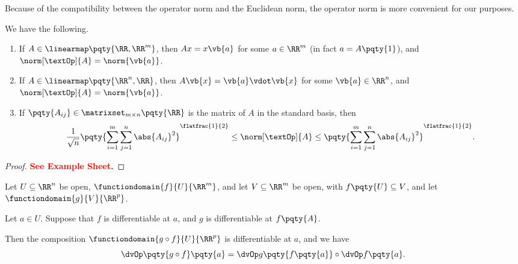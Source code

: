 Because of the compatibility between the operator norm and the Euclidean norm, the operator norm is more convenient for our purposes.

\begin{proposition}
    We have the following.

    \begin{enumerate}[label=(\roman*)]
        \item If \(A \in \linearmap\pqty{\RR, \RR^m}\), then \(Ax = x \vb{a}\) for some \(a \in \RR^m\) (in fact \(a = A\pqty{1}\)), and \(\norm[\textOp]{A} = \norm{\vb{a}}\).
        \item If \(A \in \linearmap\pqty{\RR^n, \RR}\), then \(A\vb{x} = \vb{a} \vdot \vb{x}\) for some \(\vb{a} \in \RR^n\), and \(\norm[\textOp]{A} = \norm{\vb{a}}\).
        \item If \(\pqty{A_{ij}} \in \matrixset_{m \times n}\pqty{\RR}\) is the matrix of \(A\) in the standard basis, then
        \[
            \frac{1}{\sqrt{n}} \pqty{\sum_{i = 1}^{m} \sum_{j = 1}^{n} \abs{A_{ij}}^2}^{\flatfrac{1}{2}} \leq \norm[\textOp]{A} \leq \pqty{\sum_{i = 1}^{m} \sum_{j = 1}^{n} \abs{A_{ij}}^2}^{\flatfrac{1}{2}}.
        \]
    \end{enumerate}
\end{proposition}

\begin{proof}
    \textbf{\textcolor{red}{See Example Sheet.}}
\end{proof}

\begin{theorem}
    \label{thm:chain-rule}%
    Let \(U \subseteq \RR^n\) be open, \(\functiondomain{f}{U}{\RR^m}\), and let \(V \subseteq \RR^m\) be open, with \(f\pqty{U} \subseteq V\), and let \(\functiondomain{g}{V}{\RR^p}\).
    
    Let \(a \in U\). Suppose that \(f\) is differentiable at \(a\), and \(g\) is differentiable at \(f\pqty{A}\).

    Then the composition \(\functiondomain{g \circ f}{U}{\RR^p}\) is differentiable at \(a\), and we have
    \[
        \dvOp\pqty{g \circ f}\pqty{a} = \dvOp g\pqty{f\pqty{a}} \circ \dvOp f\pqty{a}.
    \]
\end{theorem}

